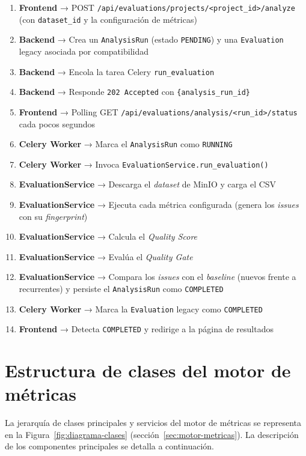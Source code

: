 \begin{enumerate}
  \item \textbf{Frontend} → POST
    \texttt{/api/evaluations/projects/<project\_id>/analyze} (con
    \texttt{dataset\_id} y la configuración de métricas)
  \item \textbf{Backend} → Crea un \texttt{AnalysisRun} (estado
    \texttt{PENDING}) y una \texttt{Evaluation} legacy asociada por
    compatibilidad
  \item \textbf{Backend} → Encola la tarea Celery \texttt{run\_evaluation}
  \item \textbf{Backend} → Responde \texttt{202 Accepted} con
    \texttt{\{analysis\_run\_id\}}
  \item \textbf{Frontend} → Polling GET
    \texttt{/api/evaluations/analysis/<run\_id>/status} cada pocos segundos
  \item \textbf{Celery Worker} → Marca el \texttt{AnalysisRun} como
    \texttt{RUNNING}
  \item \textbf{Celery Worker} → Invoca
    \texttt{EvaluationService.run\_evaluation()}
  \item \textbf{EvaluationService} → Descarga el \emph{dataset} de MinIO y
    carga el \ac{CSV}
  \item \textbf{EvaluationService} → Ejecuta cada métrica configurada
    (genera los \emph{issues} con su \emph{fingerprint})
  \item \textbf{EvaluationService} → Calcula el \emph{Quality Score}
  \item \textbf{EvaluationService} → Evalúa el \emph{Quality Gate}
  \item \textbf{EvaluationService} → Compara los \emph{issues} con el
    \emph{baseline} (nuevos frente a recurrentes) y persiste el
    \texttt{AnalysisRun} como \texttt{COMPLETED}
  \item \textbf{Celery Worker} → Marca la \texttt{Evaluation} legacy como
    \texttt{COMPLETED}
  \item \textbf{Frontend} → Detecta \texttt{COMPLETED} y redirige a la
    página de resultados
\end{enumerate}

\section{Estructura de clases del motor de métricas}

La jerarquía de clases principales y servicios del motor de métricas se
representa en la Figura~\ref{fig:diagrama-clases}
(sección~\ref{sec:motor-metricas}). La descripción de los componentes
principales se detalla a continuación.

